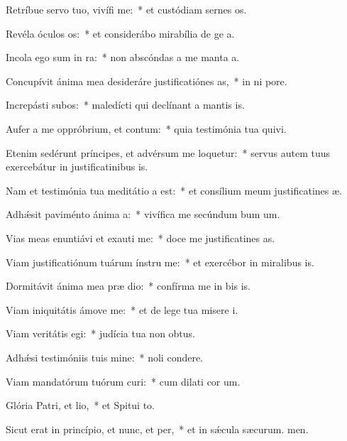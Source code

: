 \item Retríbue servo tuo, vivífi me:~* et custódiam sernes os.
\item Revéla óculos os:~* et considerábo mirabília de ge a.
\item Incola ego sum in ra:~* non abscóndas a me manta a.
\item Concupívit ánima mea desideráre justificatiónes as,~* in ni pore.
\item Increpásti subos:~* maledícti qui declínant a mantis is.
\item Aufer a me oppróbrium, et contum:~* quia testimónia tua quivi.
\item Etenim sedérunt príncipes, et advérsum me loquetur:~* servus autem tuus exercebátur in justificatinibus is.
\item Nam et testimónia tua meditátio a est:~* et consílium meum justificatines æ.
\item Adhǽsit paviménto ánima a:~* vivífica me secúndum bum um.
\item Vias meas enuntiávi et exauti me:~* doce me justificatines as.
\item Viam justificatiónum tuárum ínstru me:~* et exercébor in miralibus is.
\item Dormitávit ánima mea præ dio:~* confírma me in bis is.
\item Viam iniquitátis ámove  me:~* et de lege tua misere i.
\item Viam veritátis egi:~* judícia tua non  obtus.
\item Adhǽsi testimóniis tuis mine:~* noli  condere.
\item Viam mandatórum tuórum curi:~* cum dilati cor um.
\item Glória Patri, et lio,~* et Spitui to.
\item Sicut erat in princípio, et nunc, et per,~* et in sǽcula sæcurum. men.
